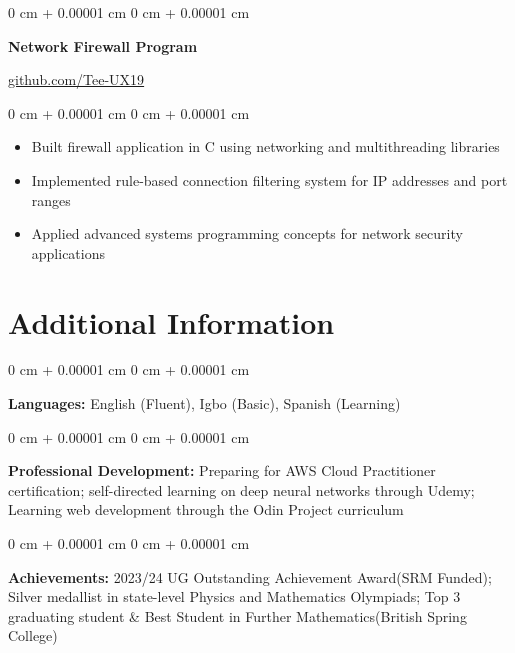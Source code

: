 \documentclass[10pt, a4paper]{article}
\newenvironment{highlights}{
    \begin{itemize}[
        topsep=0.10 cm,
        parsep=0.10 cm,
        partopsep=0pt,
        itemsep=0pt,
        leftmargin=20pt
    ]
}{
    \end{itemize}
} %
\newenvironment{onecolentry}{
    \begin{adjustwidth}{
        0 cm + 0.00001 cm
    }{
        0 cm + 0.00001 cm
    }
}{
    \end{adjustwidth}
} %
\newenvironment{twocolentry}[2][]{
    \onecolentry
    \def\secondColumn{#2}
    \setcolumnwidth{\fill, 4.5 cm}
    \begin{paracol}{2}
}{
    \switchcolumn \raggedleft \secondColumn
    \end{paracol}
    \endonecolentry
} %
\begin{document}
    \begin{twocolentry}{
        \href{https://github.com/Tee-UX19}{github.com/Tee-UX19}
    }
        \textbf{Network Firewall Program}
    \end{twocolentry}

    \vspace{0.10 cm}
    \begin{onecolentry}
        \begin{highlights}
            \item Built firewall application in C using networking and multithreading libraries
            \item Implemented rule-based connection filtering system for IP addresses and port ranges
            \item Applied advanced systems programming concepts for network security applications
        \end{highlights}
    \end{onecolentry}

    \section{Additional Information}

    \begin{onecolentry}
        \textbf{Languages:} English (Fluent), Igbo (Basic), Spanish (Learning)
    \end{onecolentry}

    \vspace{0.2 cm}

    \begin{onecolentry}
        \textbf{Professional Development:} Preparing for AWS Cloud Practitioner certification; self-directed learning on deep neural networks through Udemy; Learning web development through the Odin Project curriculum
    \end{onecolentry}

    \vspace{0.2 cm}

    \begin{onecolentry}
        \textbf{Achievements:} 2023/24 UG Outstanding Achievement Award(SRM Funded); Silver medallist in state-level Physics and Mathematics Olympiads; Top 3 graduating student \& Best Student in Further Mathematics(British Spring College)
    \end{onecolentry}

    \vspace{0.2 cm}

\end{document}
